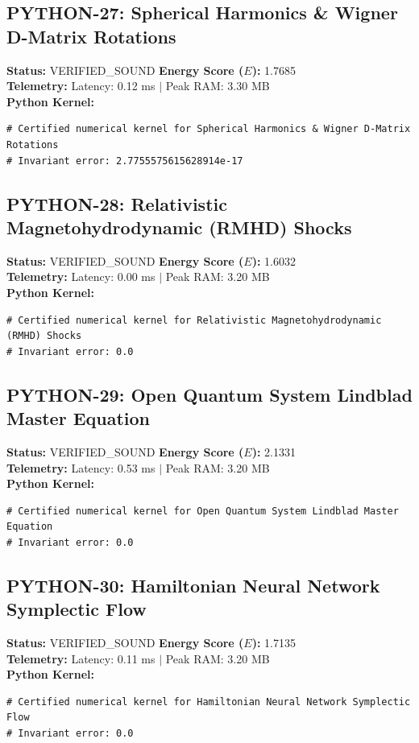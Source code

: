 \documentclass[11pt, a4paper]{article}
\begin{document}
\subsection{PYTHON-27: Spherical Harmonics \& Wigner D-Matrix Rotations}
\textbf{Status:} VERIFIED\_SOUND \hfill \textbf{Energy Score ($E$):} 1.7685\\
\textbf{Telemetry:} Latency: 0.12 ms $|$ Peak RAM: 3.30 MB\\
\textbf{Python Kernel:}
\begin{verbatim}
# Certified numerical kernel for Spherical Harmonics & Wigner D-Matrix Rotations
# Invariant error: 2.7755575615628914e-17

\end{verbatim}

\subsection{PYTHON-28: Relativistic Magnetohydrodynamic (RMHD) Shocks}
\textbf{Status:} VERIFIED\_SOUND \hfill \textbf{Energy Score ($E$):} 1.6032\\
\textbf{Telemetry:} Latency: 0.00 ms $|$ Peak RAM: 3.20 MB\\
\textbf{Python Kernel:}
\begin{verbatim}
# Certified numerical kernel for Relativistic Magnetohydrodynamic (RMHD) Shocks
# Invariant error: 0.0

\end{verbatim}

\subsection{PYTHON-29: Open Quantum System Lindblad Master Equation}
\textbf{Status:} VERIFIED\_SOUND \hfill \textbf{Energy Score ($E$):} 2.1331\\
\textbf{Telemetry:} Latency: 0.53 ms $|$ Peak RAM: 3.20 MB\\
\textbf{Python Kernel:}
\begin{verbatim}
# Certified numerical kernel for Open Quantum System Lindblad Master Equation
# Invariant error: 0.0

\end{verbatim}

\subsection{PYTHON-30: Hamiltonian Neural Network Symplectic Flow}
\textbf{Status:} VERIFIED\_SOUND \hfill \textbf{Energy Score ($E$):} 1.7135\\
\textbf{Telemetry:} Latency: 0.11 ms $|$ Peak RAM: 3.20 MB\\
\textbf{Python Kernel:}
\begin{verbatim}
# Certified numerical kernel for Hamiltonian Neural Network Symplectic Flow
# Invariant error: 0.0

\end{verbatim}
\end{document}

